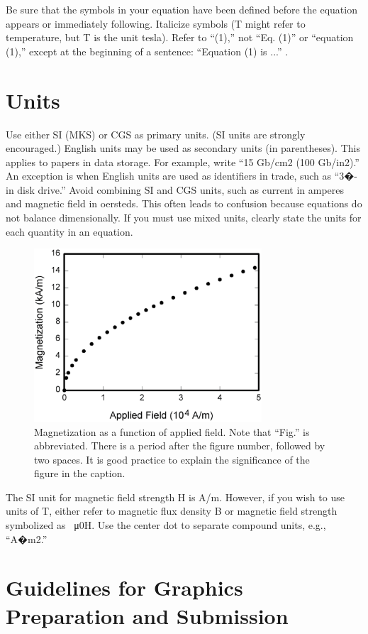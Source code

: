 \documentclass[journal]{IEEEtranTIE}
\begin{document}
Be sure that the symbols in your equation have been defined before the equation appears or immediately following. Italicize symbols (T might refer to temperature, but T is the unit tesla). Refer to ``(1),'' not ``Eq. (1)'' or ``equation (1),'' except at the beginning of a sentence: ``Equation (1) is ...'' .
		
\section{Units}

Use either SI (MKS) or CGS as primary units. (SI units are strongly encouraged.) English units may be used as secondary units (in parentheses). This applies to papers in data storage. For example, write ``15 Gb/cm2 (100 Gb/in2).'' An exception is when English units are used as identifiers in trade, such as ``3�-in disk drive.'' Avoid combining SI and CGS units, such as current in amperes and magnetic field in oersteds. This often leads to confusion because equations do not balance dimensionally. If you must use mixed units, clearly state the units for each quantity in an equation.


\begin{figure}[!t]\centering
	\includegraphics[width=8.5cm]{FIG1.eps}
	\caption{Magnetization as a function of applied field. Note that ``Fig.'' is abbreviated. There is a period after the figure number, followed by two spaces. It is good practice to explain the significance of the figure in the caption.}\label{FIG_1}
\end{figure}


The SI unit for magnetic field strength H is A/m. However, if you wish to use units of T, either refer to magnetic flux density B or magnetic field strength symbolized as \SI{}{\micro0H}. Use the center dot to separate compound units, e.g., ``A�m2.''

\section{Guidelines for Graphics Preparation and Submission}
\end{document}
